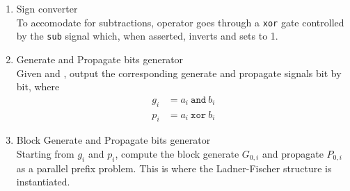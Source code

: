 \begin{enumerate}
    \item Sign converter \\
    To accomodate for subtractions, operator  goes through a \texttt{xor} gate controlled by the
    \texttt{sub} signal which, when asserted, inverts  and sets  to 1.

    \item Generate and Propagate bits generator \\
    Given  and , output the corresponding generate and propagate signals bit by bit, where
    \begin{align*}
        g_i &= a_i\ \texttt{and}\ b_i \\
        p_i &= a_i\ \texttt{xor}\ b_i
    \end{align*}

    \item Block Generate and Propagate bits generator \\
    Starting from $g_i$ and $p_i$, compute the block generate $G_{0, i}$ and propagate $P_{0, i}$ as a parallel prefix
    problem. This is where the Ladner-Fischer structure is instantiated.


\end{enumerate}

